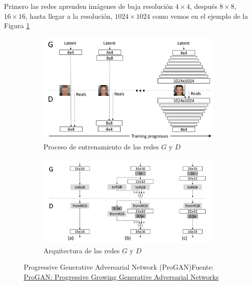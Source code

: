 Primero las redes aprenden imágenes de baja resolución ${4 \times 4}$, después ${8 \times 8}$, ${16 \times 16}$, hasta llegar a la resolución, ${1024 \times 1024}$ como vemos en el ejemplo de la Figura \ref{subfig:ProGAN-1}

\begin{figure}[H]
    \centering
    \captionsetup{justification=centering}

    \begin{subfigure}{.475\linewidth}
        \centering
        \includegraphics[width=0.75\linewidth]{figures/chapter02/ProGAN-image-32.png}
        \caption{Proceso de entrenamiento de las redes ${G}$ y ${D}$}
        \label{subfig:ProGAN-1}
    \end{subfigure}
    \vspace{0.03\linewidth}
    \begin{subfigure}{.475\linewidth}
        \centering
        \includegraphics[width=0.75\linewidth]{figures/chapter02/ProGAN-image-16.png}
        \caption{Arquitectura de las redes ${G}$ y ${D}$}
        \label{subfig:ProGAN-2}
    \end{subfigure}

    \caption{Progressive Generative Adversarial Network (ProGAN)\newline{}Fuente: \href{https://blog.paperspace.com/progan/}{ProGAN: Progressive Growing Generative Adversarial Networks}}
    \label{fig:ProGAN}
\end{figure}



